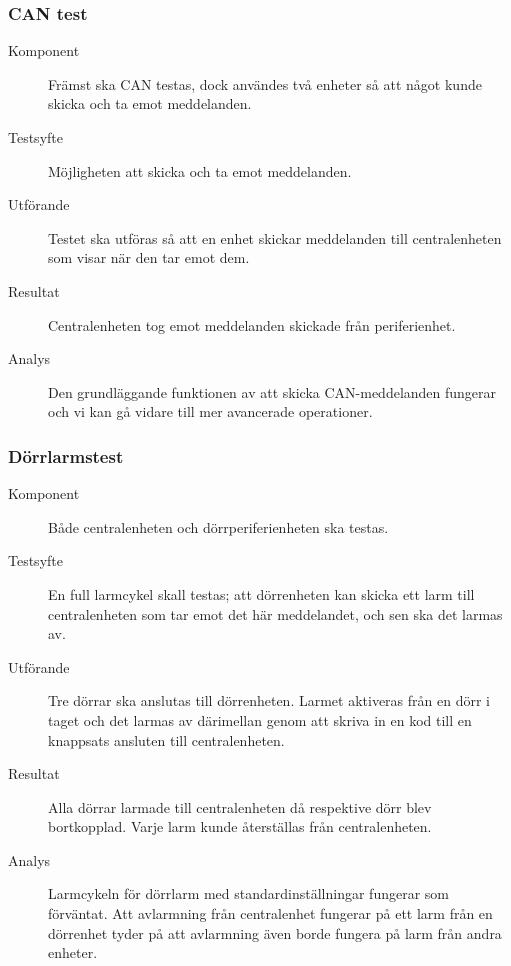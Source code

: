 \documentclass[a4paper]{article}
\begin{document}
\subsubsection{CAN test}
\begin{description}
\item[Komponent] Främst ska CAN testas, dock användes två enheter så att något kunde skicka och ta emot meddelanden.

\item[Testsyfte] Möjligheten att skicka och ta emot meddelanden.

\item[Utförande] Testet ska utföras så att en enhet skickar meddelanden till centralenheten som visar när den tar emot dem.

\item[Resultat] Centralenheten tog emot meddelanden skickade från periferienhet.

\item[Analys] Den grundläggande funktionen av att skicka CAN-meddelanden fungerar och vi kan gå vidare till mer avancerade operationer.
\end{description}

\subsubsection{Dörrlarmstest}
\begin{description}
\item[Komponent] Både centralenheten och dörrperiferienheten ska testas.

\item[Testsyfte] En full larmcykel skall testas; att dörrenheten kan skicka ett larm till centralenheten som tar emot det här meddelandet, och sen ska det larmas av.

\item[Utförande] Tre dörrar ska anslutas till dörrenheten. Larmet aktiveras från en dörr i taget och det larmas av därimellan genom att skriva in en kod till en knappsats ansluten till centralenheten.

\item[Resultat] Alla dörrar larmade till centralenheten då respektive dörr blev bortkopplad. Varje larm kunde återställas från centralenheten.

\item[Analys] Larmcykeln för dörrlarm med standardinställningar fungerar som förväntat.
Att avlarmning från centralenhet fungerar på ett larm från en dörrenhet tyder på att avlarmning även borde fungera på larm från andra enheter.
\end{description}
\end{document}
